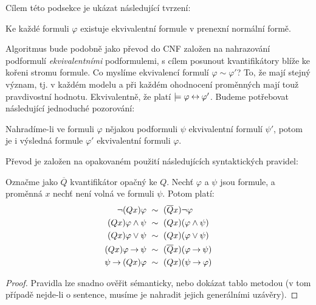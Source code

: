 Cílem této podsekce je ukázat následující tvrzení:

\begin{proposition}\label{proposition:convert-to-pnf}
    Ke každé formuli $\varphi$ existuje ekvivalentní formule v prenexní normální formě.
\end{proposition}

Algoritmus bude podobně jako převod do CNF založen na nahrazování podformulí \emph{ekvivalentními} podformulemi, s cílem posunout kvantifikátory blíže ke kořeni stromu formule. Co myslíme ekvivalencí formulí $\varphi\sim\varphi'$? To, že mají stejný význam, tj. v každém modelu a při každém ohodnocení proměnných mají touž pravdivostní hodnotu. Ekvivalentně, že platí $\models\varphi\mathbin{\leftrightarrow}\varphi'$. Budeme potřebovat následující jednoduché pozorování:

\begin{observation}\label{observation:pnf-one-step}
    Nahradíme-li ve formuli $\varphi$ nějakou podformuli $\psi$ ekvivalentní formulí $\psi'$, potom je i výsledná formule $\varphi'$ ekvivalentní formuli $\varphi$.
\end{observation}

Převod je založen na opakovaném použití následujících syntaktických pravidel:

\begin{lemma}\label{lemma:pnf-conversion-rules}
    Označme jako $\overline{Q}$ kvantifikátor opačný ke $Q$. Nechť $\varphi$ a $\psi$ jsou formule, a proměnná $x$ nechť není volná ve formuli $\psi$. Potom platí:
    \begin{align*}
        \neg (Qx)\varphi\ &\sim\ (\overline{Q}x)\neg\varphi\\
        (Qx)\varphi \land \psi\ &\sim\ (Qx)(\varphi \land \psi)\\
        (Qx)\varphi \lor \psi\ &\sim\ (Qx)(\varphi \lor \psi)\\
        (Qx)\varphi \mathbin{\rightarrow} \psi\ &\sim\ (\overline{Q}x)(\varphi \mathbin{\rightarrow} \psi)\\
        \psi \mathbin{\rightarrow} (Qx)\varphi\ &\sim\ (Qx)(\psi \mathbin{\rightarrow} \varphi)
    \end{align*}
\end{lemma}
\begin{proof}
    Pravidla lze snadno ověřit sémanticky, nebo dokázat tablo metodou (v tom případě nejde-li o sentence, musíme je nahradit jejich generálními uzávěry).
\end{proof}

